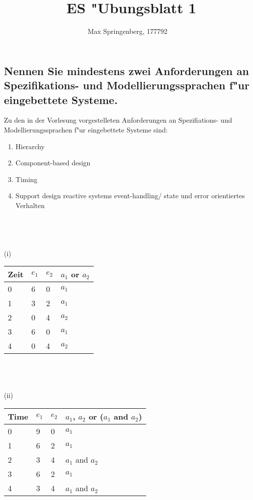 \documentclass{article}
\author{Max Springenberg, 177792}
\title{\
    ES "Ubungsblatt 1
    }
\date{}
\newcommand{\gap}{\ \\ \\}
\begin{document}
\maketitle
\newpage

\subsection{Nennen Sie mindestens zwei Anforderungen an Spezifikations- und 
            Modellierungssprachen f"ur eingebettete Systeme.}

Zu den in der Vorlesung vorgestelleten Anforderungen an Spezifiations- und 
    Modellierungssprachen f"ur eingebettete Systeme sind:\\

\begin{enumerate}
    \item Hierarchy
    \item Component-based design
    \item Timing
    \item Support design reactive systems
        \subitem event-handling/ state und error orientiertes Verhalten
\end{enumerate}

\subsection{}
\\

\subsection{}
(i)\\
\begin{tabular}{l|l|l|l}
    Zeit    &$e_1$   &$e_2$      & $a_1$ or $a_2$\\
    \hline
    0       &6       &0          & $a_1$\\
    1       &3       &2          & $a_1$\\
    2       &0       &4          & $a_2$\\
    3       &6       &0          & $a_1$\\
    4       &0       &4          & $a_2$\\
\end{tabular}\\
\gap
(ii)\\
\begin{tabular}{l|l|l|l}
    Time    &$e_1$   &$e_2$      & $a_1$, $a_2$ or ($a_1$ and $a_2$)\\
    \hline
    0       &9       &0          & $a_1$\\
    1       &6       &2          & $a_1$\\
    2       &3       &4          & $a_1$ and $a_2$\\
    3       &6       &2          & $a_1$\\
    4       &3       &4          & $a_1$ and $a_2$\\
\end{tabular}
\end{document}
